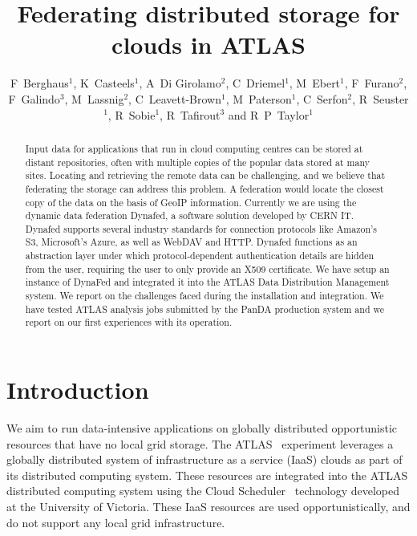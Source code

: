 \documentclass[a4paper]{jpconf}
\begin{document}
\title{Federating distributed storage for clouds in ATLAS}

\author{F~Berghaus$^1$, K~Casteels$^1$, A~Di Girolamo$^2$, C~Driemel$^1$, M~Ebert$^1$, F~Furano$^2$, F~Galindo$^3$, M~Lassnig$^2$, C~Leavett-Brown$^1$, M~Paterson$^1$, C~Serfon$^2$, R~Seuster$^1$, R~Sobie$^1$, R~Tafirout$^3$ and R~P~Taylor$^1$}
\address{$^1$ Department of Physics and Astronomy, University of Victoria, Finnerty Road, Victoria V8P~5C2, Canada}
\address{$^2$ CERN, Geneva 1211, Switzerland}
\address{$^3$ TRIUMF, Wesbrook Mall, Vancouver V6T~2A3 Canada}


\begin{abstract}
Input data for applications that run in cloud computing centres can be stored at distant repositories, often with multiple copies of the popular data stored at many sites. Locating and retrieving the remote data can be challenging, and we believe that federating the storage can address this problem. A federation would locate the closest copy of the data on the basis of GeoIP information. Currently we are using the dynamic data federation Dynafed, a software solution developed by CERN IT. Dynafed supports several industry standards for connection protocols like Amazon's S3, Microsoft's Azure, as well as WebDAV and HTTP. Dynafed functions as an abstraction layer under which protocol-dependent authentication details are  hidden from the user, requiring the user to only provide an X509 certificate. We have setup an instance of DynaFed and integrated it into the ATLAS Data Distribution Management system. We report on the challenges faced during the installation and integration. We have tested ATLAS analysis jobs submitted by the PanDA production system and we report on our first experiences with its operation.
\end{abstract}

\section{Introduction}
We aim to run data-intensive applications on globally distributed opportunistic resources that have no local grid storage. The ATLAS~\cite{atlas} experiment leverages a globally distributed system of infrastructure as a service (IaaS) clouds as part of its distributed computing system. These resources are integrated into the ATLAS distributed computing system using the Cloud Scheduler~\cite{cloud-scheduler} technology developed at the University of Victoria. These IaaS resources are used opportunistically, and do not support any local grid infrastructure.
\end{document}
